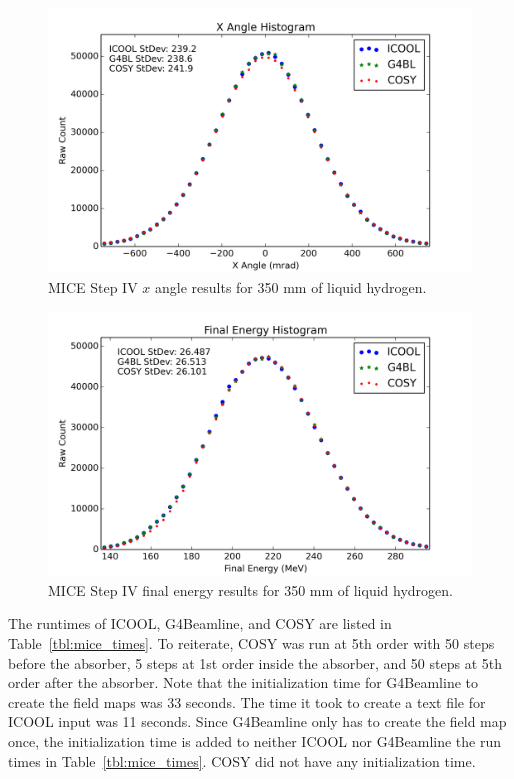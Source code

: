 \begin{figure}[H]
  \centering
    \includegraphics[width=\textwidth]{MICE data/px} 
  \caption{MICE Step IV $x$ angle results for 350 mm of liquid hydrogen.}
  \label{fig:micexangle}
\end{figure}

\begin{figure}[H]
  \centering
    \includegraphics[width=\textwidth]{MICE data/e} 
  \caption{MICE Step IV final energy results for 350 mm of liquid hydrogen.}
  \label{fig:miceenergy}
\end{figure}

The runtimes of ICOOL, G4Beamline, and COSY are listed in Table~\ref{tbl:mice_times}. To reiterate, COSY was run at 5th order with 50 steps before the absorber, 5 steps at 1st order inside the absorber, and 50 steps at 5th order after the absorber. Note that the initialization time for G4Beamline to create the field maps was 33 seconds. The time it took to create a text file for ICOOL input was 11 seconds. Since G4Beamline only has to create the field map once, the initialization time is added to neither ICOOL nor G4Beamline the run times in Table~\ref{tbl:mice_times}. COSY did not have any initialization time.

